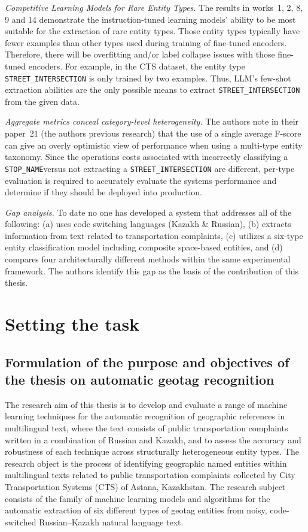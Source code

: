 \textit{ Competitive Learning Models for Rare Entity Types.} The results in works~1, 2, 8, 9 and 14 demonstrate the instruction-tuned learning models' ability to be most suitable for the extraction of rare entity types. Those entity types typically have fewer examples than other types used during training of fine-tuned encoders. Therefore, there will be overfitting and/or label collapse issues with those fine-tuned encoders. For example, in the CTS dataset, the entity type \texttt{STREET\_INTERSECTION} is only trained by two examples. Thus, LLM's few-shot extraction abilities are the only possible means to extract \texttt{STREET\_INTERSECTION} from the given data.

\textit{Aggregate metrics conceal category-level heterogeneity.} The authors note in their paper~21 (the authors previous research) that the use of a single average F-score can give an overly optimistic view of performance when using a multi-type entity taxonomy. Since the operations costs associated with incorrectly classifying a \texttt{STOP\_NAME}versus not extracting a \texttt{STREET\_INTERSECTION} are different, per-type evaluation is required to accurately evaluate the systems performance and determine if they should be deployed into production.

\textit{Gap analysis.} To date no one has developed a system that addresses all of the following: (a) uses code switching languages (Kazakh \& Russian), (b) extracts information from text related to transportation complaints, (c) utilizes a six-type entity classification model including composite space-based entities, and (d) compares four architecturally different methods within the same experimental framework. The authors identify this gap as the basis of the contribution of this thesis.

\section{Setting the task}
\label{sec:task}

\subsection{Formulation of the purpose and objectives of the thesis on automatic geotag recognition}
\label{sec:objectives}

The research aim of this thesis is to develop and evaluate a range of machine learning techniques for the automatic recognition of geographic references in multilingual text, where the text consists of public transportation complaints written in a combination of Russian and Kazakh, and to assess the accuracy and robustness of each technique across structurally heterogeneous entity types. The research object is the process of identifying geographic named entities within multilingual texts related to public transportation complaints collected by City Transportation Systems (CTS) of Astana, Kazakhstan. The research subject consists of the family of machine learning models and algorithms for the automatic extraction of six different types of geotag entities from noisy, code-switched Russian--Kazakh natural language text.

